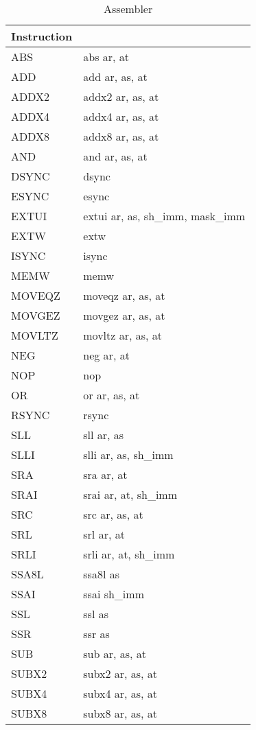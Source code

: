 \begin{smalltables}
	\begin{longtable}{|p{5cm}|p{5cm}|}
		\caption{Assembler\label{long}}\\
		\hline
		Instruction & \\
		\hline
        \endhead
		ABS & abs ar, at\\ \hline
		ADD & add ar, as, at\\ \hline
		ADDX2 & addx2 ar, as, at\\ \hline
		ADDX4 & addx4 ar, as, at\\ \hline
		ADDX8 & addx8 ar, as, at\\ \hline
		AND & and ar, as, at\\ \hline
		DSYNC & dsync\\ \hline
		ESYNC & esync\\ \hline
		EXTUI & extui ar, as, sh\_imm, mask\_imm\\ \hline
		EXTW & extw\\ \hline
		ISYNC & isync\\ \hline
		MEMW & memw\\ \hline
		MOVEQZ & moveqz ar, as, at\\ \hline
		MOVGEZ & movgez ar, as, at\\ \hline
		MOVLTZ & movltz ar, as, at\\ \hline
		NEG & neg ar, at\\ \hline
		NOP & nop\\ \hline
		OR & or ar, as, at\\ \hline
		RSYNC & rsync\\ \hline
		SLL & sll ar, as\\ \hline
		SLLI & slli ar, as, sh\_imm\\ \hline
		SRA & sra ar, at\\ \hline
		SRAI & srai ar, at, sh\_imm\\ \hline
		SRC & src ar, as, at\\ \hline
		SRL & srl ar, at\\ \hline
		SRLI & srli ar, at, sh\_imm\\ \hline
		SSA8L & ssa8l as\\ \hline
		SSAI & ssai sh\_imm\\ \hline
		SSL & ssl as\\ \hline
		SSR & ssr as\\ \hline
		SUB & sub ar, as, at\\ \hline
        SUBX2 & subx2 ar, as, at\\ \hline
        SUBX4 & subx4 ar, as, at\\ \hline
        SUBX8 & subx8 ar, as, at\\ \hline
	\end{longtable}
\end{smalltables}